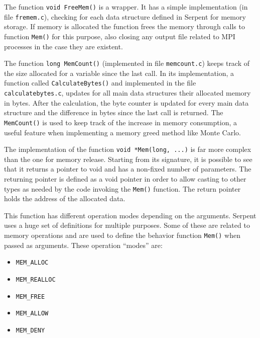 \documentclass[twoside,a4paper,12pt,english]{anstrans}
\begin{document}
The function \texttt{void FreeMem()} is a wrapper. It has a simple implementation (in file \texttt{fremem.c}), checking
for each data structure defined in Serpent for memory storage. If memory is allocated the function frees the memory
through calls to function \texttt{Mem()} for this purpose, also closing any output file related to MPI processes
in the case they are existent.

The function \texttt{long MemCount()} (implemented in file \texttt{memcount.c}) keeps track
of the size allocated for a variable since the last
call. In its implementation, a function called \texttt{CalculateBytes()} and implemented in the file
\texttt{calculatebytes.c}, updates for all main data structures their allocated memory in bytes.
After the calculation, the byte counter is updated for every main data structure and the difference
in bytes since the last call is returned. The \texttt{MemCount()} is used to keep track of the increase
in memory consumption, a useful feature when implementing a memory greed method like Monte Carlo.

  

The implementation of the function \texttt{void *Mem(long, ...)} is far more complex than the one for
memory release. Starting from its signature, it is possible to see that it returns a pointer to void
and has a non-fixed number of parameters. The returning pointer is defined as a void pointer in order
to allow casting to other types as needed by the code invoking the \texttt{Mem()}
function. The return pointer holds the address of the allocated data.

This function has different operation modes depending on the arguments. Serpent uses a huge set of definitions for
multiple purposes. Some of these are related to memory operations and are used to define the behavior function \texttt{Mem()}
when passed as arguments. These operation ``modes'' are:


\begin{itemize}
\item \texttt{MEM\_ALLOC}
\item \texttt{MEM\_REALLOC}
\item \texttt{MEM\_FREE}
\item \texttt{MEM\_ALLOW}
\item \texttt{MEM\_DENY}
\end{itemize} 
\end{document}
